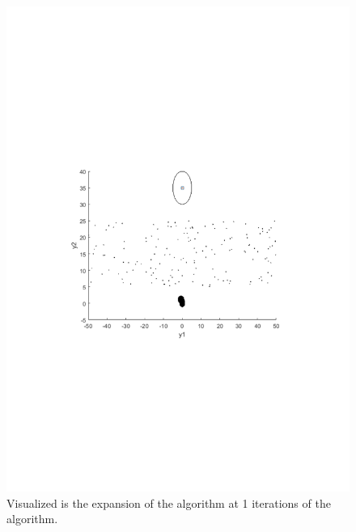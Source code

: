 \begin{figure}[!t]
  \centering
  \begin{minipage}[c]{.9\columnwidth}
  \includegraphics[scale=.5, trim={5cm, 9cm, 5cm, 7cm}, clip]{figures/experiments/rrtfunnel-1samples.pdf}
  \caption[The expansion of the \rrtfunnel algorithm at 1, and 101 iterations]{Visualized is the expansion of the \rrtfunnel algorithm at 1 iterations of the algorithm.}
  \end{minipage}
  \newline
  \begin{minipage}[c]{.9\columnwidth}

\end{minipage}
\end{figure}
